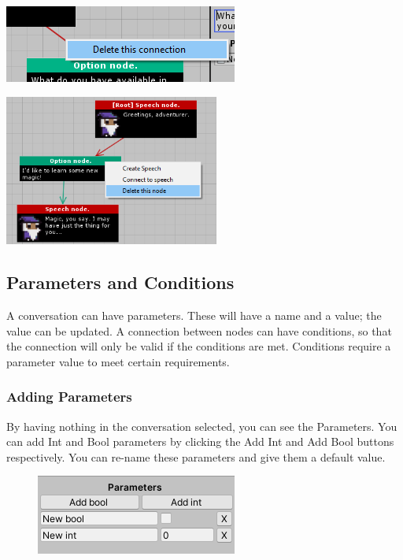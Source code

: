 \documentclass[a4paper,12pt]{article}
\begin{document}
\begin{minipage}[c]{0.45\textwidth}
\centering
\includegraphics[keepaspectratio]{img/DeleteConnection.png}
\end{minipage}
\hfill
\begin{minipage}[c]{0.45\textwidth}
\centering
\includegraphics[width=200pt, keepaspectratio]{img/DeleteNode.png}
\end{minipage}

\newpage



\subsection{Parameters and Conditions}
A conversation can have parameters. These will have a name and a value; the value can be updated. A connection between nodes can have conditions, so that the connection will only be valid if the conditions are met. Conditions require a parameter value to meet certain requirements.

\subsubsection{Adding Parameters}
By having nothing in the conversation selected, you can see the Parameters. You can add Int and Bool parameters by clicking the Add Int and Add Bool buttons respectively. You can re-name these parameters and give them a default value. 

\begin{figure}[h]
\centering
\includegraphics[keepaspectratio]{img/Parameters.png}
\end{figure}
\end{document}
